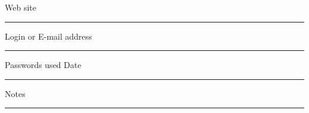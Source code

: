 \clearpage

\large

\noindent Web site \
\vspace{-.125in} \\ \rule{\textwidth}{.6pt}
\vspace{0.175in}

\noindent Login or E-mail address \
\vspace{-.125in} \\ \rule{\textwidth}{.6pt}
\vspace{0.175in}

\noindent Passwords used
\hspace{1.7in}
Date \
\vspace{-.125in} \\ \rule{\textwidth}{.6pt}
\vspace{1.6in}

\noindent Notes \
\vspace{-.125in} \\ \rule{\textwidth}{.6pt}

\normalsize
